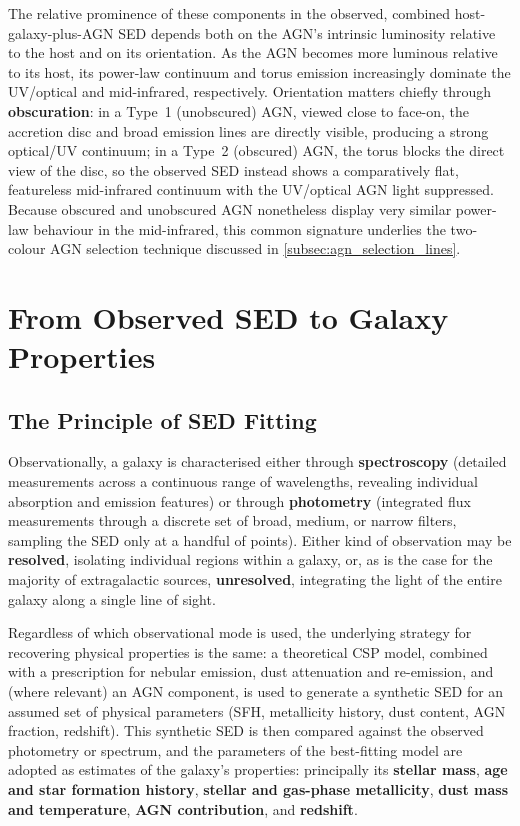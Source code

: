 \medskip

The relative prominence of these components in the observed, combined host-galaxy-plus-AGN SED depends both on the AGN's intrinsic luminosity relative to the host and on its orientation. As the AGN becomes more luminous relative to its host, its power-law continuum and torus emission increasingly dominate the UV/optical and mid-infrared, respectively. Orientation matters chiefly through \textbf{obscuration}: in a Type~1 (unobscured) AGN, viewed close to face-on, the accretion disc and broad emission lines are directly visible, producing a strong optical/UV continuum; in a Type~2 (obscured) AGN, the torus blocks the direct view of the disc, so the observed SED instead shows a comparatively flat, featureless mid-infrared continuum with the UV/optical AGN light suppressed. Because obscured and unobscured AGN nonetheless display very similar power-law behaviour in the mid-infrared, this common signature underlies the two-colour AGN selection technique discussed in \cref{subsec:agn_selection_lines}.

\section{From Observed SED to Galaxy Properties} \label{sec:sed_fitting_principle}

\subsection{The Principle of SED Fitting} \label{subsec:sed_fitting_principle_detail}

Observationally, a galaxy is characterised either through \textbf{spectroscopy} (detailed measurements across a continuous range of wavelengths, revealing individual absorption and emission features) or through \textbf{photometry} (integrated flux measurements through a discrete set of broad, medium, or narrow filters, sampling the SED only at a handful of points). Either kind of observation may be \textbf{resolved}, isolating individual regions within a galaxy, or, as is the case for the majority of extragalactic sources, \textbf{unresolved}, integrating the light of the entire galaxy along a single line of sight.

\medskip

Regardless of which observational mode is used, the underlying strategy for recovering physical properties is the same: a theoretical CSP model, combined with a prescription for nebular emission, dust attenuation and re-emission, and (where relevant) an AGN component, is used to generate a synthetic SED for an assumed set of physical parameters (SFH, metallicity history, dust content, AGN fraction, redshift). This synthetic SED is then compared against the observed photometry or spectrum, and the parameters of the best-fitting model are adopted as estimates of the galaxy's properties: principally its \textbf{stellar mass}, \textbf{age and star formation history}, \textbf{stellar and gas-phase metallicity}, \textbf{dust mass and temperature}, \textbf{AGN contribution}, and \textbf{redshift}.

